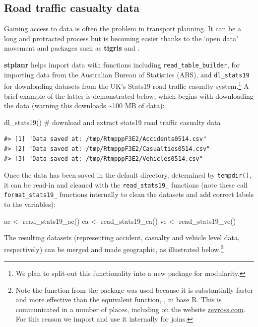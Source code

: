 \subsection{Road traffic casualty data}\label{accessing-and-processing-transport-data}

Gaining access to data is often the problem in transport planning.
It can be a long and protracted process but is becoming
easier thanks to the `open data' movement and packages such as
\textbf{tigris} and 
\citep{walker_tigris:_2016}.

\textbf{stplanr} helps import data with functions including
\texttt{read\_table\_builder}, for importing data from the
Australian Bureau of Statistics (ABS), and
\texttt{dl\_stats19} for downloading datasets from the UK's Stats19 road traffic
casualty system.\footnote{
We plan to split-out this functionality into a new package for modularity.
}
A brief example of the latter is demonstrated below,
which begins with downloading the data (warning this downloads
\textasciitilde{}100 MB of data):

\begin{Schunk}
\begin{Sinput}
dl_stats19() # download and extract stats19 road traffic casualty data
\end{Sinput}
\end{Schunk}

\begin{verbatim}
#> [1] "Data saved at: /tmp/RtmpppF3E2/Accidents0514.csv"
#> [2] "Data saved at: /tmp/RtmpppF3E2/Casualties0514.csv"
#> [3] "Data saved at: /tmp/RtmpppF3E2/Vehicles0514.csv"
\end{verbatim}

Once the data has been saved in the default directory, determined by
\texttt{tempdir()}, it can be read-in and cleaned with the
\texttt{read\_stats19\_} functions (note these call
\texttt{format\_stats19\_} functions internally to clean the datasets
and add correct labels to the variables):

\begin{Schunk}
\begin{Sinput}
ac <- read_stats19_ac()
ca <- read_stats19_ca()
ve <- read_stats19_ve()
\end{Sinput}
\end{Schunk}

The resulting datasets (representing accident, casualty and vehicle
level data, respectively) can be merged and made geographic, as
illustrated below.\footnote{
Note the  function from the  package was used because it is substantially faster and more effective than the equivalent function, , in base R.
This is communicated in a number of places, including on the website \href{http://zevross.com/blog/2014/04/30/mini-post-for-large-tables-in-r-dplyrs-function-inner_join-is-much-faster-than-merge/}{zevross.com}. For this reason we import  and use it internally for joins.}

